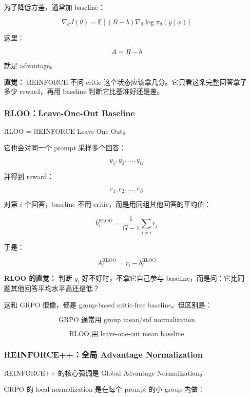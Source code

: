 为了降低方差，通常加 baseline：

\[
\nabla_\theta J(\theta)
=
\mathbb{E}
\left[
(R-b)
\nabla_\theta
\log \pi_\theta(y\mid x)
\right]
\]

这里：

\[
A = R-b
\]

就是 advantage。

\begin{intubox}
\textbf{直觉：} REINFORCE 不问 critic 这个状态应该拿几分。它只看这条完整回答拿了多少 reward，再用 baseline 判断它比基准好还是差。
\end{intubox}

\subsubsection{RLOO：Leave-One-Out Baseline}

RLOO = REINFORCE Leave-One-Out。

它也会对同一个 prompt 采样多个回答：

\[
y_1,y_2,\ldots,y_G
\]

并得到 reward：

\[
r_1,r_2,\ldots,r_G
\]

对第 $i$ 个回答，baseline 不用 critic，而是用同组其他回答的平均值：

\[
b_i^\text{RLOO}
=
\frac{1}{G-1}
\sum_{j\ne i}
r_j
\]

于是：

\[
A_i^\text{RLOO}
=
r_i-b_i^\text{RLOO}
\]

\begin{summarybox}
\textbf{RLOO 的直觉：} 判断 $y_i$ 好不好时，不拿它自己参与 baseline，而是问：它比同题其他回答平均水平高还是低？
\end{summarybox}

这和 GRPO 很像，都是 group-based critic-free baseline。但区别是：

\[
\text{GRPO 通常用 group mean/std normalization}
\]

\[
\text{RLOO 用 leave-one-out mean baseline}
\]

\subsubsection{REINFORCE++：全局 Advantage Normalization}

REINFORCE++ 的核心强调是 Global Advantage Normalization。

GRPO 的 local normalization 是在每个 prompt 的小 group 内做：

